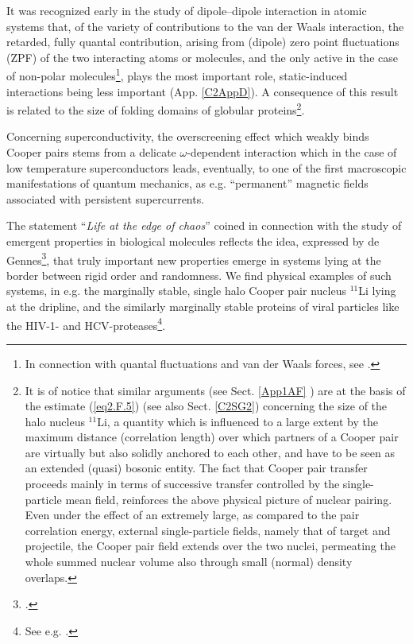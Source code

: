 It was recognized early in the study of dipole--dipole interaction in atomic systems that, of the variety of contributions to the van der Waals interaction, the retarded, fully quantal contribution, arising from (dipole) zero point fluctuations (ZPF) of the two interacting atoms or molecules, and the only active  in the case of non-polar molecules\footnote{In connection with quantal fluctuations and van der Waals forces, see \cite{London:37}.}, plays the most important role, static-induced interactions being less important (App. \ref{C2AppD}). A consequence of this result is related to the size of folding domains of globular proteins\footnote{It is of notice that similar arguments (see Sect. \ref{App1AF} ) are at the basis of the estimate (\ref{eq2.F.5}) (see also Sect. \ref{C2SG2}) concerning the size of the halo nucleus $^{11}$Li, a quantity which is influenced to a large extent by the maximum distance (correlation length)  over which  partners of a Cooper pair are virtually  but also solidly anchored to each other, and have to be seen as an extended (quasi) bosonic entity. The fact that Cooper pair transfer proceeds mainly in terms of successive transfer controlled by the single-particle mean field, reinforces the above physical picture of nuclear pairing. Even under the effect of an extremely large, as compared to the pair correlation energy, external single-particle fields, namely that of target and projectile, the Cooper pair field extends over the two nuclei, permeating the whole summed nuclear volume also through  small (normal) density overlaps.}.  


Concerning superconductivity, the overscreening effect which  weakly binds Cooper pairs stems from a delicate $\omega$-dependent interaction which in the case of low temperature superconductors leads, eventually, to one of the first macroscopic manifestations of quantum mechanics, as e.g. ``permanent'' magnetic fields associated with persistent  supercurrents.

The statement ``\textit{Life at the edge of chaos}'' coined in connection with the study of emergent properties in biological molecules reflects the idea,  expressed by de Gennes\footnote{\cite{DeGennes:94}.}, that truly important new properties  emerge in systems lying at the border between rigid order and randomness.  We find physical examples of such systems, in e.g. the marginally stable, single  halo Cooper pair nucleus $^{11}$Li lying at the dripline, and the similarly marginally stable proteins of   viral particles like the HIV-1- and HCV-proteases\footnote{See e.g. \cite{Broglia:13b}.}.



